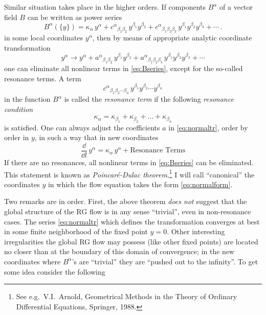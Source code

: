 Similar situation takes place in the higher orders. If components $B^\alpha$ of a
vector field $B$ can be written as power series
\begin{equation}\label{eq:Bseries}
B^\alpha(\{y\})=\kappa_\alpha\,y^\alpha+c^\alpha{}_{\beta_1\beta_2}\,y^{\beta_1}y^{\beta_2}+c^\alpha{}_{\beta_1\beta_2\beta_3}\,y^{\beta_1}y^{\beta_2}y^{\beta_3}+\cdots\,.
\end{equation}
in some local coordinates $y^\alpha$, then by means of appropriate analytic
coordinate transformation
\begin{equation}\label{eq:normaltr}
y^\alpha\to y^\alpha+a^\alpha{}_{\beta_1\beta_2}\,y^{\beta_1}y^{\beta_2}+a^\alpha{}_{\beta_1\beta_2\beta_3}\,y^{\beta_1}y^{\beta_2}y^{\beta_3}+\cdots
\end{equation}
one can eliminate all nonlinear terms in \eqref{eq:Bseries}, except for the
so-called resonance terms. A term
\begin{equation}\label{eq:resterm}
c^\alpha{}_{\beta_1\beta_2\cdots\beta_n}\,y^{\beta_1}y^{\beta_2}\cdots y^{\beta_n}
\end{equation}
in the function $B^\alpha$ is called the \emph{resonance term} if the following
\emph{resonance condition}
\begin{equation}\label{eq:rescond}
\kappa_\alpha=\kappa_{\beta_1}+\kappa_{\beta_2}+\dots+\kappa_{\beta_n}
\end{equation}
is satisfied. One can always adjust the coefficients $a$ in \eqref{eq:normaltr},
order by order in $y$, in such a way that in new coordinates
\begin{equation}\label{eq:normalform}
\frac{\dd}{\dd l}\,y^\alpha=\kappa_\alpha\,y^\alpha+\text{Resonance Terms}
\end{equation}
If there are no resonances, all nonlinear terms in \eqref{eq:Bseries} can be
eliminated. This statement is known as \emph{Poincar\'e-Dulac
theorem}.\footnote{See e.g.\ V.I.~Arnold, Geometrical Methods in the Theory of
Ordinary Differential Equations, Springer, 1988.} I will call ``canonical'' the
coordinates $y$ in which the flow equation takes the form \eqref{eq:normalform}.

Two remarks are in order. First, the above theorem \emph{does not} suggest that
the global structure of the RG flow is in any sense ``trivial'', even in
non-resonance cases. The series \eqref{eq:normaltr} which defines the
transformation converges at best in some finite neighborhood of the fixed point
$y=0$. Other interesting irregularities the global RG flow may possess (like
other fixed points) are located no closer than at the boundary of this domain of
convergence; in the new coordinates where $B^\alpha$'s are ``trivial'' they are
``pushed out to the infinity''. To get some idea consider the following

